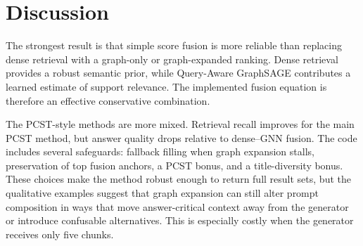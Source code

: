 \documentclass{article}
\begin{document}
\begin{table}[t]
  \centering
  \small
  \caption{Qualitative cases from the saved LLM evaluation JSONs. These examples illustrate why fusion improves bridge answers but graph expansion can still hurt downstream generation.}
  \label{tab:qualitative}
\end{table}

\section{Discussion}

The strongest result is that simple score fusion is more reliable than replacing dense retrieval with a graph-only or graph-expanded ranking. Dense retrieval provides a robust semantic prior, while Query-Aware GraphSAGE contributes a learned estimate of support relevance. The implemented fusion equation is therefore an effective conservative combination.

The PCST-style methods are more mixed. Retrieval recall improves for the main PCST method, but answer quality drops relative to dense--GNN fusion. The code includes several safeguards: fallback filling when graph expansion stalls, preservation of top fusion anchors, a PCST bonus, and a title-diversity bonus. These choices make the method robust enough to return full result sets, but the qualitative examples suggest that graph expansion can still alter prompt composition in ways that move answer-critical context away from the generator or introduce confusable alternatives. This is especially costly when the generator receives only five chunks.
\end{document}
